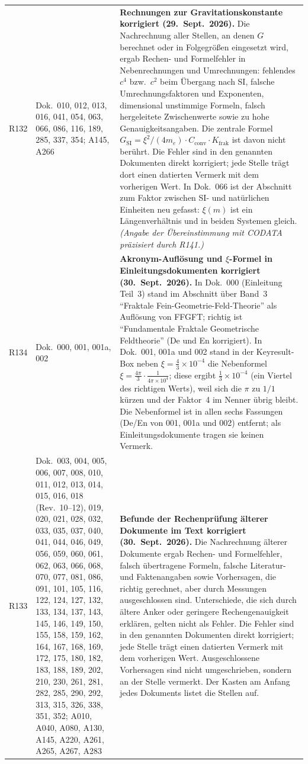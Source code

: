 \begin{longtable}{@{}p{0.9cm}p{3.1cm}p{10.2cm}@{}}
R132 & Dok.~010, 012, 013, 016, 041, 054, 063, 066, 086, 116, 189, 285, 337, 354; A145, A266 & \textbf{Rechnungen zur Gravitationskonstante korrigiert (29.~Sept.~2026).} Die Nachrechnung aller Stellen, an denen $G$ berechnet oder in Folgegrößen eingesetzt wird, ergab Rechen- und Formelfehler in Nebenrechnungen und Umrechnungen: fehlendes $c^4$ bzw.\ $c^2$ beim Übergang nach SI, falsche Umrechnungsfaktoren und Exponenten, dimensional unstimmige Formeln, falsch hergeleitete Zwischenwerte sowie zu hohe Genauigkeitsangaben. Die zentrale Formel $G_{\text{SI}}=\xi^2/(4m_e)\cdot C_{\text{conv}}\cdot K_{\text{frak}}$ ist davon nicht berührt. Die Fehler sind in den genannten Dokumenten direkt korrigiert; jede Stelle trägt dort einen datierten Vermerk mit dem vorherigen Wert. In Dok.~066 ist der Abschnitt zum Faktor zwischen SI- und natürlichen Einheiten neu gefasst: $\xi(m)$ ist ein Längenverhältnis und in beiden Systemen gleich. \emph{(Angabe der Übereinstimmung mit CODATA präzisiert durch R141.)} \\
R134 & Dok.~000, 001, 001a, 002 & \textbf{Akronym-Auflösung und $\xi$-Formel in Einleitungsdokumenten korrigiert (30.~Sept.~2026).} In Dok.~000 (Einleitung Teil~3) stand im Abschnitt über Band~3 ``Fraktale Fein-Geometrie-Feld-Theorie'' als Auflösung von FFGFT; richtig ist ``Fundamentale Fraktale Geometrische Feldtheorie'' (De und En korrigiert). In Dok.~001, 001a und 002 stand in der Keyresult-Box neben $\xi=\frac{4}{3}\times10^{-4}$ die Nebenformel $\xi = \frac{4\pi}{3}\cdot\frac{1}{4\pi\times10^4}$; diese ergibt $\frac{1}{3}\times10^{-4}$ (ein Viertel des richtigen Werts), weil sich die $\pi$ zu $1/1$ kürzen und der Faktor~4 im Nenner übrig bleibt. Die Nebenformel ist in allen sechs Fassungen (De/En von 001, 001a und 002) entfernt; als Einleitungsdokumente tragen sie keinen Vermerk. \\
R133 & Dok.~003, 004, 005, 006, 007, 008, 010, 011, 012, 013, 014, 015, 016, 018 (Rev.~10--12), 019, 020, 021, 028, 032, 033, 035, 037, 040, 041, 044, 046, 049, 056, 059, 060, 061, 062, 063, 066, 068, 070, 077, 081, 086, 091, 101, 105, 116, 122, 124, 127, 132, 133, 134, 137, 143, 145, 146, 149, 150, 155, 158, 159, 162, 164, 167, 168, 169, 172, 175, 180, 182, 183, 188, 189, 202, 210, 230, 261, 281, 282, 285, 290, 292, 313, 315, 326, 338, 351, 352; A010, A040, A080, A130, A145, A220, A261, A265, A267, A283 & \textbf{Befunde der Rechenprüfung älterer Dokumente im Text korrigiert (30.~Sept.~2026).} Die Nachrechnung älterer Dokumente ergab Rechen- und Formelfehler, falsch übertragene Formeln, falsche Literatur- und Faktenangaben sowie Vorhersagen, die richtig gerechnet, aber durch Messungen ausgeschlossen sind. Unterschiede, die sich durch ältere Anker oder geringere Rechengenauigkeit erklären, gelten nicht als Fehler. Die Fehler sind in den genannten Dokumenten direkt korrigiert; jede Stelle trägt einen datierten Vermerk mit dem vorherigen Wert. Ausgeschlossene Vorhersagen sind nicht umgeschrieben, sondern an der Stelle vermerkt. Der Kasten am Anfang jedes Dokuments listet die Stellen auf. \\

\end{longtable}
